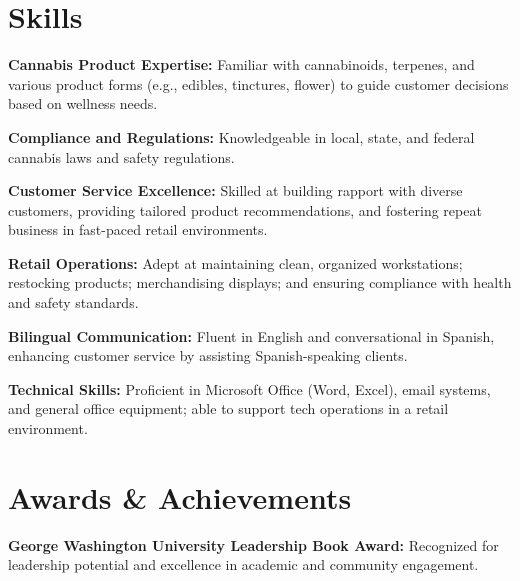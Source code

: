 \documentclass[letterpaper,11pt]{article}
\newcommand{\resumeSubHeadingListStart}{\begin{itemize}[leftmargin=0.15in, label={}]}
\newcommand{\resumeSubHeadingListEnd}{\end{itemize}}
\begin{document}
\section{Skills}
\vspace{2pt}
\resumeSubHeadingListStart
\small{\item{
\textbf{Cannabis Product Expertise:} Familiar with cannabinoids, terpenes, and various product forms (e.g., edibles, tinctures, flower) to guide customer decisions based on wellness needs. \\
\vspace{4pt}

\textbf{Compliance and Regulations:} Knowledgeable in local, state, and federal cannabis laws and safety regulations. \\
\vspace{4pt}

\textbf{Customer Service Excellence:} Skilled at building rapport with diverse customers, providing tailored product recommendations, and fostering repeat business in fast-paced retail environments. \\
\vspace{4pt}

\textbf{Retail Operations:} Adept at maintaining clean, organized workstations; restocking products; merchandising displays; and ensuring compliance with health and safety standards. \\
\vspace{4pt}

\textbf{Bilingual Communication:} Fluent in English and conversational in Spanish, enhancing customer service by assisting Spanish-speaking clients. \\
\vspace{4pt}

\textbf{Technical Skills:} Proficient in Microsoft Office (Word, Excel), email systems, and general office equipment; able to support tech operations in a retail environment.
}}
\resumeSubHeadingListEnd



\section{Awards \& Achievements}
\vspace{2pt}
\resumeSubHeadingListStart
    \small{\item{
        \textbf{George Washington University Leadership Book Award:}{ Recognized for leadership potential and excellence in academic and community engagement.} \vspace{3pt}
    }}
\resumeSubHeadingListEnd

\end{document}
